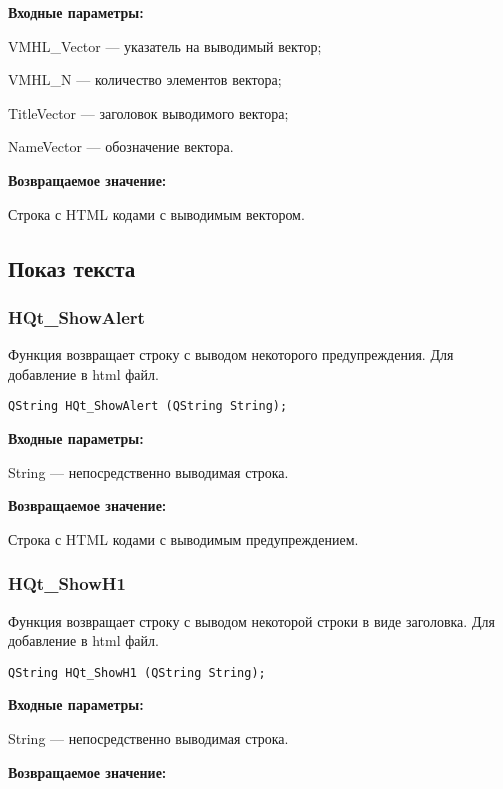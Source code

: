 \documentclass[a4paper,12pt]{article}
\begin{document}
\textbf{Входные параметры:}
 
    VMHL\_Vector --- указатель на выводимый вектор;
 
    VMHL\_N --- количество элементов вектора;
 
    TitleVector --- заголовок выводимого вектора;
 
    NameVector --- обозначение вектора.

\textbf{Возвращаемое значение:}

 
    Строка с HTML кодами с выводимым вектором.


\subsection{Показ текста}

\subsubsection{HQt\_ShowAlert}\label{HQt_ShowAlert}

Функция возвращает строку с выводом некоторого предупреждения. Для добавление в html файл.


\begin{lstlisting}[label=code_syntax_HQt_ShowAlert,caption=Синтаксис]
QString HQt_ShowAlert (QString String);
\end{lstlisting}

\textbf{Входные параметры:}

String --- непосредственно выводимая строка.

\textbf{Возвращаемое значение:}

Строка с HTML кодами с выводимым предупреждением.


\subsubsection{HQt\_ShowH1}\label{HQt_ShowH1}

Функция возвращает строку с выводом некоторой строки в виде заголовка. Для добавление в html файл.


\begin{lstlisting}[label=code_syntax_HQt_ShowH1,caption=Синтаксис]
QString HQt_ShowH1 (QString String);
\end{lstlisting}

\textbf{Входные параметры:}

String --- непосредственно выводимая строка.

\textbf{Возвращаемое значение:}
\end{document}
